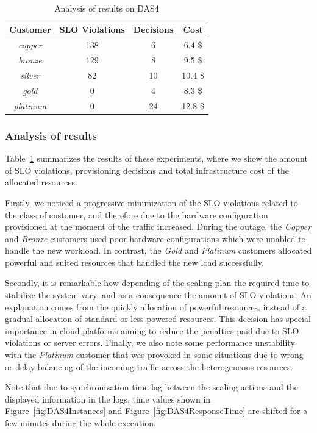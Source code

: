 \begin{table}
  {\scriptsize 
\begin{center}
    \begin{tabular}{  | c | c | c | c  |}
    \hline
         \textbf{Customer}  & \textbf{SLO Violations} & \textbf{Decisions}  & \textbf{Cost}   \\ \hline
   \textit{copper}   & 138  &  6 &  6.4 \$ \\ \hline   
   \textit{bronze}  &  129 &   8&  9.5 \$  \\ \hline   
   \textit{silver}  &  82  & 10  &  10.4 \$  \\ \hline   
   \textit{gold}  & 0  &  4  &   8.3 \$    \\ \hline   
\textit{platinum} &  0 & 24 & 12.8 \$  \\ \hline   

 \end{tabular}
\end{center}
\vspace{-3mm}
\caption{Analysis of results on DAS4}
\label{summaryDAS4}
}
\end{table}

\subsubsection{Analysis of results}

Table~\ref{summaryDAS4} summarizes the results of these experiments, where we show the amount of SLO violations, provisioning decisions and total infrastructure cost of the allocated resources. 

Firstly, we noticed a progressive minimization of the SLO violations related to the class of customer, and therefore due to the hardware configuration provisioned at the moment of the traffic increased. During the outage, the \emph{Copper} and \emph{Bronze} customers used poor hardware configurations which were unabled to handle the new workload. In contrast, the \emph{Gold}  and \emph{Platinum} customers allocated powerful and suited resources that handled the new load successfully.

Secondly, it is remarkable how depending of the scaling plan the required time to stabilize the system vary, and as a consequence the amount of SLO violations. An explanation comes from the quickly allocation of powerful resources, instead of a gradual allocation of standard or less-powered resources. This decision has special importance in cloud platforms aiming to reduce the penalties paid due to SLO violations or server errors. Finally, we also note some performance unstability with the \emph{Platinum} customer that was provoked in some situations due to wrong or delay balancing of the incoming traffic across the heterogeneous resources.

Note that due to synchronization time lag between the scaling actions and the displayed information in the logs, time values shown in Figure~\ref{fig:DAS4Instances} and Figure~\ref{fig:DAS4ResponseTime} are shifted for a few minutes during the whole execution.

